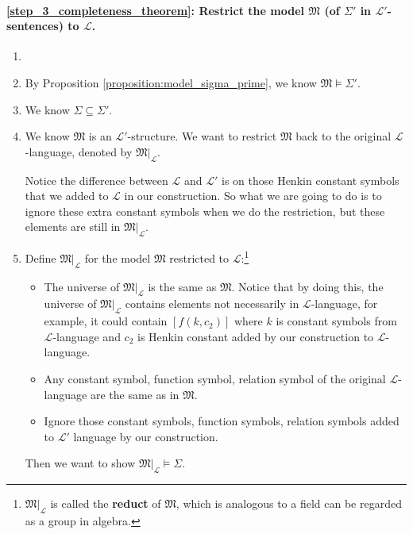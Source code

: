 \documentclass[11pt,letterpaper]{book}
\theoremstyle{definition}
\begin{document}
\paragraph{\ref{step_3_completeness_theorem}: Restrict the model
$\mathfrak{M}$ (of $\Sigma'$ in $\mathcal{L}'$-sentences) to $\mathcal{L}$.}

\begin{enumerate}
\item[]
\item{By Proposition \ref{proposition:model_sigma_prime}, we know
$\mathfrak{M} \models \Sigma'$.}
\item{We know $\Sigma \subseteq \Sigma'$.}
\item{We know $\mathfrak{M}$ is an $\mathcal{L}'$-structure. We want to
restrict $\mathfrak{M}$ back to the original $\mathcal{L}$-language,
denoted by $\mathfrak{M}|_{\mathcal{L}}$.

       Notice the difference between $\mathcal{L}$ and $\mathcal{L}'$ is
on those Henkin constant symbols that we added to $\mathcal{L}$ in our
construction. So what we are going to do is to ignore these extra
constant symbols when we do the restriction, but these elements are
still in $\mathfrak{M}|_{\mathcal{L}}$.}

\item{ Define $\mathfrak{M}|_{\mathcal{L}}$ for the model $\mathfrak{M}$
restricted to $\mathcal{L}$:\footnote{$\mathfrak{M}|_{\mathcal{L}}$ is
called the \textbf{reduct} of $\mathfrak{M}$, which is analogous to a
field can be regarded as a group in algebra. }

\begin{itemize}
\item {The universe of $\mathfrak{M}|_{\mathcal{L}}$ is the same as
$\mathfrak{M}$.
Notice that by doing this, the universe of $\mathfrak{M}|_{\mathcal{L}}$
contains elements not necessarily in $\mathcal{L}$-language, for
example, it could contain $[f(k, c_2)]$ where $k$ is constant symbols
from $\mathcal{L}$-language and $c_2$ is Henkin constant added by our
construction to $\mathcal{L}$-language. }
       \item{Any constant symbol, function symbol, relation symbol of the
original $\mathcal{L}$-language are the same as in $\mathfrak{M}$.}
       \item{Ignore those constant symbols, function symbols, relation
symbols added to $\mathcal{L}'$ language by our construction.}
      \end{itemize}


Then we want to show $\mathfrak{M} |_{\mathcal{L}} \models \Sigma $.

}
\end{enumerate}
\end{document}
